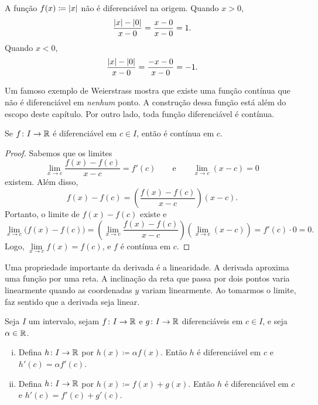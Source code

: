 \begin{example}
A função $f(x) \coloneqq \lvert {x} \rvert$ não é diferenciável
na origem. Quando $x > 0$,
\begin{equation*}
\frac{\lvert {x} \rvert-\lvert {0} \rvert}{x-0} =
\frac{x-0}{x-0} = 1 .
\end{equation*}
Quando $x < 0$,
\begin{equation*}
\frac{\lvert {x} \rvert-\lvert {0} \rvert}{x-0} =
\frac{-x-0}{x-0} = -1 .
\end{equation*}
\end{example}

Um famoso exemplo de Weierstrass mostra que existe uma função contínua
que não é diferenciável em \emph{nenhum} ponto. A construção dessa função
está além do escopo deste capítulo. Por outro lado, toda função diferenciável
é contínua.

\begin{prop}
Se $f \colon I \to {\mathbb{R}}$ é diferenciável em $c \in I$,
então é contínua em $c$.
\end{prop}

\begin{proof}
Sabemos que os limites
\begin{equation*}
\lim_{x\to c}\frac{f(x)-f(c)}{x-c} = f'(c)
\qquad
\text{e}
\qquad
\lim_{x\to c}(x-c) = 0
\end{equation*}
existem. Além disso,
\begin{equation*}
f(x)-f(c) = 
\left( \frac{f(x)-f(c)}{x-c} \right) (x-c) .
\end{equation*}
Portanto, o limite de $f(x)-f(c)$ existe e
\begin{equation*}
\lim_{x\to c} \bigl( f(x)-f(c) \bigr) =
\left(\lim_{x\to c} \frac{f(x)-f(c)}{x-c} \right)
\left(\lim_{x\to c} (x-c) \right) =
f'(c) \cdot 0  = 0.
\end{equation*}
Logo, $\lim\limits_{x\to c} f(x) = f(c)$, e $f$ é contínua em $c$.
\end{proof}

Uma propriedade importante da derivada é a linearidade. A derivada aproxima
uma função por uma reta. A inclinação da reta que passa por dois pontos
varia linearmente quando as coordenadas $y$ variam linearmente.
Ao tomarmos o limite, faz sentido que a derivada seja linear.

\begin{prop}[Linearidade]
Seja $I$ um intervalo, sejam
$f \colon I \to {\mathbb{R}}$ e $g \colon I \to {\mathbb{R}}$ diferenciáveis em $c \in I$,
e seja $\alpha \in {\mathbb{R}}$.
\begin{enumerate}[(i)]
\item
Defina $h \colon I \to {\mathbb{R}}$ por $h(x) \coloneqq \alpha f(x)$. Então
$h$ é diferenciável em $c$ e
$h'(c) = \alpha f'(c)$.
\item
Defina $h \colon I \to {\mathbb{R}}$ por $h(x) \coloneqq f(x) + g(x)$. Então
$h$ é diferenciável em $c$ e
$h'(c) =  f'(c) + g'(c)$.
\end{enumerate}
\end{prop}

